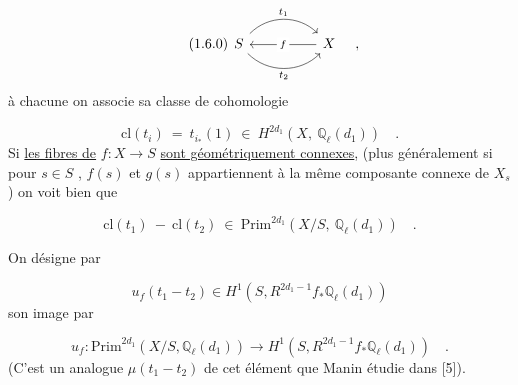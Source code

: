 \begin{equation}\tag{1.6.0}
\begin{tikzcd}[column sep=huge]
S \arrow[r, bend left=45, "t_1"] \arrow[r, bend right=45, "t_2"'] & X \arrow[l, "f" description]
\end{tikzcd} \quad ,
\end{equation}
à chacune on associe sa classe de cohomologie

\begin{equation}\tag{1.6.1}
\mathrm{cl}(t_i) \ = \ t_{i_*}(1) \ \in \ H^{2d_1} (X, \ \mathbb{Q}_\ell(d_1)) \quad .
\end{equation}
Si \underline{les fibres de} $f : X \longrightarrow S$ \underline{sont géométriquement connexes}, (plus généralement si pour $s \in S$ , $f(s)$ et $g(s)$ appartiennent à la même composante connexe de $X_s$ ) on voit bien que

\begin{equation}\tag{1.6.2}
\mathrm{cl}(t_1) \ - \ \mathrm{cl}(t_2) \ \in \ \mathrm{Prim}^{2d_1} (X/S, \ \mathbb{Q}_\ell(d_1)) \quad .
\end{equation}


On désigne par

\begin{equation}\tag{1.6.3}
u_f(t_1-t_2) \in H^1(S, R^{2d_1-1}f_*\mathbb{Q}_\ell(d_1))
\end{equation}
son image par

\begin{equation}\tag{1.6.4}
u_f : \mathrm{Prim}^{2d_1}(X/S, \mathbb{Q}_\ell(d_1)) \longrightarrow H^1(S, R^{2d_1-1}f_*\mathbb{Q}_\ell(d_1)) \quad .
\end{equation}
(C'est un analogue $\mu(t_1 - t_2)$ de cet élément que Manin étudie dans [5]).


